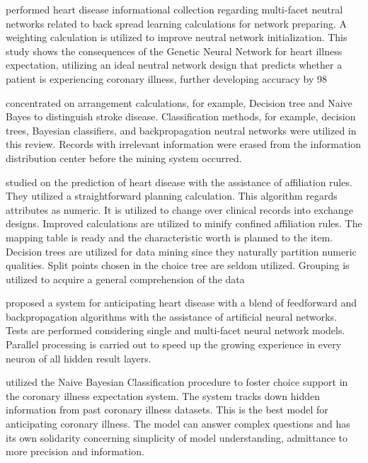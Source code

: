 {\citealp{waghulde2014genetic} performed heart disease informational collection regarding multi-facet neutral networks related to back spread learning calculations for network preparing. A weighting calculation is utilized to improve neutral network initialization. This study shows the consequences of the Genetic Neural Network for heart illness expectation, utilizing an ideal neutral network design that predicts whether a patient is experiencing coronary illness, further developing accuracy by 98%

\citealp{sudha2012effective} concentrated on arrangement calculations, for example, Decision tree and Naive Bayes to distinguish stroke disease. Classification methods, for example, decision trees, Bayesian classifiers, and backpropagation neutral networks were utilized in this review. Records with irrelevant information were erased from the information distribution center before the mining system occurred.

\citealp{ordonez2001mining} studied on the prediction of heart disease with the assistance of affiliation rules. They utilized a straightforward planning calculation. This algorithm regards attributes as numeric. It is utilized to change over clinical records into exchange designs. Improved calculations are utilized to minify confined affiliation rules. The mapping table is ready and the characteristic worth is planned to the item. Decision trees are utilized for data mining since they naturally partition numeric qualities. Split points chosen in the choice tree are seldom utilized. Grouping is utilized to acquire a general comprehension of the data


\citealp{babu2017heart} proposed a system for anticipating heart disease with a blend of feedforward and backpropagation algorithms with the assistance of artificial neural networks. Tests are performed considering single and multi-facet neural network models. Parallel processing is carried out to speed up the growing experience in every neuron of all hidden result layers.


\citealp{pattekari2012prediction} utilized the Naive Bayesian Classification procedure to foster choice support in the coronary illness expectation system. The system tracks down hidden information from past coronary illness datasets. This is the best model for anticipating coronary illness. The model can answer complex questions and has its own solidarity concerning simplicity of model understanding, admittance to more precision  and information.

}
